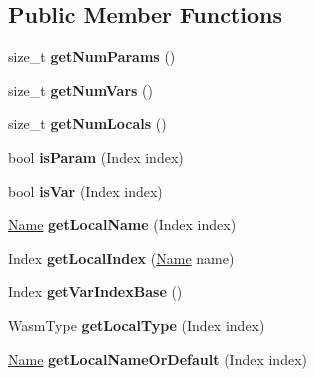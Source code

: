 \subsection*{Public Member Functions}
\begin{DoxyCompactItemize}
\item 
\mbox{\label{classwasm_1_1_function_afbe4e8f9afb605058628fd487d1f2e6b}} 
size\+\_\+t {\bfseries get\+Num\+Params} ()
\item 
\mbox{\label{classwasm_1_1_function_a46d7ab21503d4b594984ce99c2a1c26c}} 
size\+\_\+t {\bfseries get\+Num\+Vars} ()
\item 
\mbox{\label{classwasm_1_1_function_ac0ff84cd1a0c8a9e48bf7298fd60f987}} 
size\+\_\+t {\bfseries get\+Num\+Locals} ()
\item 
\mbox{\label{classwasm_1_1_function_a623fe1a52f0e680c27ad08933fd44dd4}} 
bool {\bfseries is\+Param} (Index index)
\item 
\mbox{\label{classwasm_1_1_function_a8c7c0bdcc76ea20945b38c2cf870eb3b}} 
bool {\bfseries is\+Var} (Index index)
\item 
\mbox{\label{classwasm_1_1_function_aaa7aa11b434650040f04bf205fcc4d5c}} 
\mbox{\hyperlink{structwasm_1_1_name}{Name}} {\bfseries get\+Local\+Name} (Index index)
\item 
\mbox{\label{classwasm_1_1_function_a93821b3eda92a66d18a579318d937c14}} 
Index {\bfseries get\+Local\+Index} (\mbox{\hyperlink{structwasm_1_1_name}{Name}} name)
\item 
\mbox{\label{classwasm_1_1_function_a2758c874d089e1bc77fe8bb114a0a1c8}} 
Index {\bfseries get\+Var\+Index\+Base} ()
\item 
\mbox{\label{classwasm_1_1_function_ad643c3e71007e00e08e0254dfdadcd2b}} 
Wasm\+Type {\bfseries get\+Local\+Type} (Index index)
\item 
\mbox{\label{classwasm_1_1_function_a6f2436f66468d5c506b987b9c7bd4cc2}} 
\mbox{\hyperlink{structwasm_1_1_name}{Name}} {\bfseries get\+Local\+Name\+Or\+Default} (Index index)
\end{DoxyCompactItemize}

